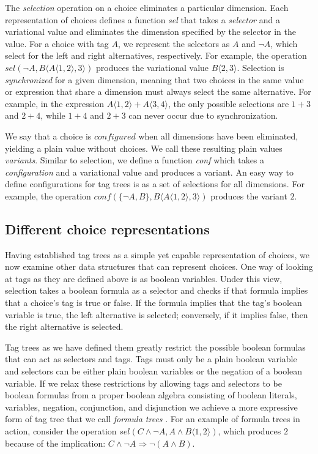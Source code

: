 \documentclass[letterpaper,10pt,onecolumn]{article}
\newcommand{\tagtree}[3]{#1 \langle #2, #3 \rangle}
\begin{document}
The \emph{selection} operation on a choice eliminates a particular dimension. Each representation
of choices defines a function \emph{sel} that takes a \emph{selector} and a variational value and
eliminates the dimension specified by the selector in the value. For a choice with tag $A$, we represent the
selectors as $A$ and $\neg A$, which select for the left and right alternatives, respectively.
For example, the operation $sel(\neg A, \tagtree{B}{\tagtree{A}{1}{2}}{3})$ produces the
variational value $\tagtree{B}{2}{3}$. Selection is \emph{synchronized} for a given
dimension, meaning that two choices in the same value or expression that share a dimension must always
select the same alternative. For example, in the expression $\tagtree{A}{1}{2}+\tagtree{A}{3}{4}$,
the only possible selections are $1+3$ and $2+4$, while $1+4$ and $2+3$ can never occur due
to synchronization.

We say that a choice is $configured$ when all dimensions
have been eliminated, yielding a plain value without choices. We call these resulting plain values
\emph{variants}. Similar to selection, we define a function \emph{conf} which takes a
\emph{configuration} and a variational value and produces a variant. An easy way to define
configurations for tag trees is as a set of selections for all dimensions. For example, the operation
$conf(\{\neg A,B\}, \tagtree{B}{\tagtree{A}{1}{2}}{3})$ produces the variant $2$.

\subsection{Different choice representations}

Having established tag trees as a simple yet capable representation of choices, we now
examine other data structures that can represent choices. One way of looking at tags
as they are defined above is as boolean variables. Under this view, selection takes a boolean
formula as a selector and checks if that formula implies that a choice's tag is true or false.
If the formula implies that the tag's boolean variable is true, the left alternative is selected;
conversely, if it implies false, then the right alternative is selected.

Tag trees as we have defined them greatly restrict the possible boolean formulas that can act
as selectors and tags. Tags must only be a plain boolean variable and selectors can be either
plain boolean variables or the negation of a boolean variable. If we relax these restrictions by
allowing tags and selectors to be boolean formulas from a proper boolean algebra
consisting of boolean literals, variables, negation, conjunction, and disjunction we achieve a
more expressive form of tag tree that we call \emph{formula trees} \cite{walkingshaw2014projectional,walkingshaw2014variational}.
For an example of formula
trees in action, consider the operation $sel(C \wedge \neg A , A \wedge B \langle 1, 2 \rangle)$,
which produces $2$ because of the implication: $C \wedge \neg A \Rightarrow \neg(A \wedge B)$.
\end{document}
